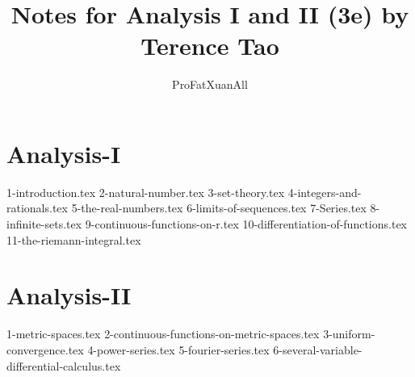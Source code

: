 \documentclass[11pt,a4paper]{book}
\theoremstyle{definition}
\theoremstyle{remark}
\begin{document}

\frontmatter

\title{Notes for Analysis I and II (3e) by Terence Tao}
\author{ProFatXuanAll}
\maketitle

\tableofcontents




\mainmatter

\part{Analysis-I}

{1-introduction.tex}
{2-natural-number.tex}
{3-set-theory.tex}
{4-integers-and-rationals.tex}
{5-the-real-numbers.tex}
{6-limits-of-sequences.tex}
{7-Series.tex}
{8-infinite-sets.tex}
{9-continuous-functions-on-r.tex}
{10-differentiation-of-functions.tex}
{11-the-riemann-integral.tex}

\part{Analysis-II}

{1-metric-spaces.tex}
{2-continuous-functions-on-metric-spaces.tex}
{3-uniform-convergence.tex}
{4-power-series.tex}
{5-fourier-series.tex}
{6-several-variable-differential-calculus.tex}


\backmatter
\end{document}
